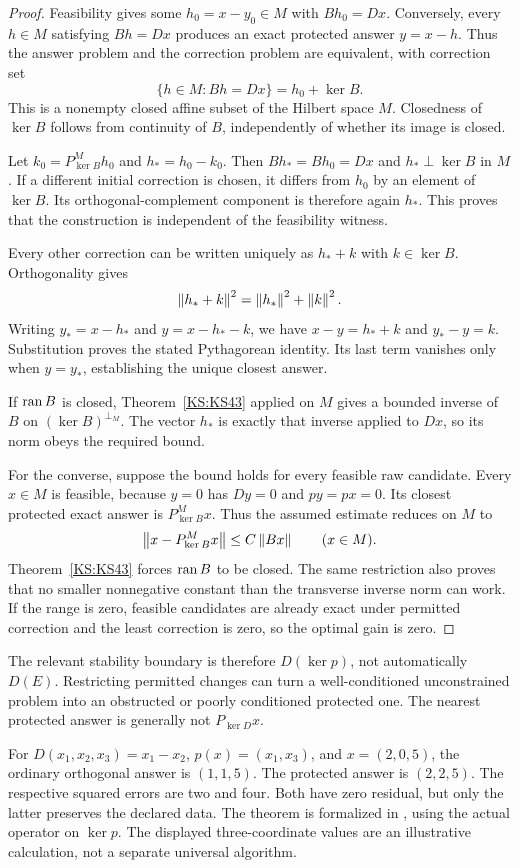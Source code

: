 \begin{proof}
Feasibility gives some $h_0=x-y_0\in M$ with $Bh_0=Dx$. Conversely, every $h\in M$ satisfying $Bh=Dx$ produces an exact protected answer $y=x-h$. Thus the answer problem and the correction problem are equivalent, with correction set
\[
 \{h\in M:Bh=Dx\}=h_0+\ker B.
\]
This is a nonempty closed affine subset of the Hilbert space $M$. Closedness of $\ker B$ follows from continuity of $B$, independently of whether its image is closed.

Let $k_0=P^M_{\ker B}h_0$ and $h_*=h_0-k_0$. Then $Bh_*=Bh_0=Dx$ and $h_*\perp\ker B$ in $M$. If a different initial correction is chosen, it differs from $h_0$ by an element of $\ker B$. Its orthogonal-complement component is therefore again $h_*$. This proves that the construction is independent of the feasibility witness.

Every other correction can be written uniquely as $h_*+k$ with $k\in\ker B$. Orthogonality gives
\[
 \left\lVert h_*+k\right\rVert^2=\left\lVert h_*\right\rVert^2+\left\lVert k\right\rVert^2.
\]
Writing $y_*=x-h_*$ and $y=x-h_*-k$, we have $x-y=h_*+k$ and $y_*-y=k$. Substitution proves the stated Pythagorean identity. Its last term vanishes only when $y=y_*$, establishing the unique closest answer.

If $\operatorname{ran} B$ is closed, Theorem~\ref{KS:KS43} applied on $M$ gives a bounded inverse of $B$ on $(\ker B)^{\perp_M}$. The vector $h_*$ is exactly that inverse applied to $Dx$, so its norm obeys the required bound.

For the converse, suppose the bound holds for every feasible raw candidate. Every $x\in M$ is feasible, because $y=0$ has $Dy=0$ and $py=px=0$. Its closest protected exact answer is $P^M_{\ker B}x$. Thus the assumed estimate reduces on $M$ to
\[
 \left\lVert x-P^M_{\ker B}x\right\rVert\le C\left\lVert Bx\right\rVert\qquad(x\in M).
\]
Theorem~\ref{KS:KS43} forces $\operatorname{ran} B$ to be closed. The same restriction also proves that no smaller nonnegative constant than the transverse inverse norm can work. If the range is zero, feasible candidates are already exact under permitted correction and the least correction is zero, so the optimal gain is zero.
\end{proof}
The relevant stability boundary is therefore \(D(\ker p)\), not automatically \(D(E)\). Restricting permitted changes can turn a well-conditioned unconstrained problem into an obstructed or poorly conditioned protected one. The nearest protected answer is generally not \(P_{\ker D}x\).

For \(D(x_1,x_2,x_3)=x_1-x_2\), \(p(x)=(x_1,x_3)\), and \(x=(2,0,5)\), the ordinary orthogonal answer is \((1,1,5)\). The protected answer is \((2,2,5)\). The respective squared errors are two and four. Both have zero residual, but only the latter preserves the declared data. The theorem is formalized in , using the actual operator on \(\ker p\). The displayed three-coordinate values are an illustrative calculation, not a separate universal algorithm.

